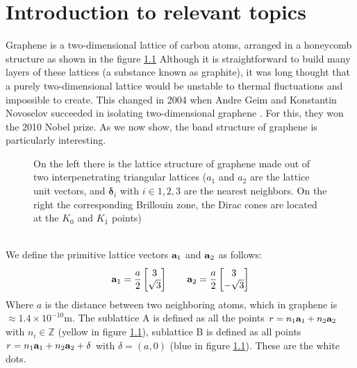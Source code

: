 \chapter{Introduction to relevant topics}
Graphene is a two-dimensional lattice of carbon atoms, arranged in a honeycomb structure as shown in the figure \ref{fig:graphene} Although it is straightforward to build many layers of these lattices (a substance known as graphite), it was long thought that a purely two-dimensional lattice would be unstable to thermal fluctuations and impossible to create.
This changed in 2004 when Andre Geim and Konstantin Novoselov succeeded in isolating two-dimensional graphene \cite{firstExfoliation}. For this, they won the 2010 Nobel prize. As we now show, the band structure of graphene is particularly interesting.
\begin{figure}[h]
    \caption{On the left there is the lattice structure of graphene made out of two interpenetrating triangular lattices ($a_1$ and $a_2$ are the lattice unit vectors, and $\mathbf \delta_{i}$ with $i\in {1,2,3}$ are the nearest neighbors. On the right the corresponding Brillouin zone, the Dirac cones are located at the $K_0$ and $K_1$ points) \cite{guinea2008review}}
    \label{fig:graphene}
\end{figure}\\
We define the primitive lattice vectors $\mathbf{a}_1$ and $\mathbf{a}_2$ as follows:
\begin{equation}
    \mathbf{a}_1=\frac{a}2
    \begin{bmatrix}
        3 \\ \sqrt 3
    \end{bmatrix}\quad \quad
    \mathbf{a}_2=\frac{a}2
    \begin{bmatrix}
        3 \\ -\sqrt 3
    \end{bmatrix}
\end{equation}
Where $a$ is the distance between two neighboring atoms, which in graphene is $\approx 1.4\times 10^{-10}$m. The sublattice A is defined as all the points $r = n_1\mathbf{a}_1 + n_2\mathbf{a}_2$ with $n_i \in \mathbb Z$ (yellow in figure \ref{fig:graphene}), sublattice B is defined as all points $r = n_1\mathbf{a}_1 + n_2\mathbf{a}_2 + \delta$ with $\delta = (a, 0)$ (blue in figure \ref{fig:graphene}). These are the white dots.


